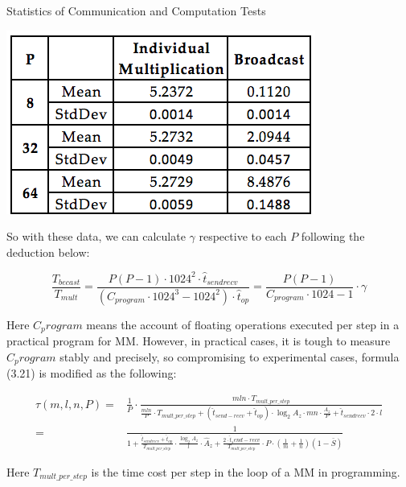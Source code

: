 \documentclass{amsart}
\theoremstyle{definition}
\theoremstyle{remark}
\numberwithin{equation}{section}
\begin{document}
\begin{table}[h]
\caption{Statistics of Communication and Computation Tests}
\includegraphics[scale=0.9]{figures/table_1.png}
\end{table}

So with these data, we can calculate $\gamma$ respective to each $P$ following the deduction below:

\begin{equation}
	\frac{T_{becast}}{T_{mult}} = \frac{P(P-1)\cdot 1024^{2} \cdot \hat{t}_{sendrecv}}{(C_{program} \cdot 1024^3 - 1024^2) \cdot \hat{t}_{op} } = \frac{P(P-1)}{C_{program} \cdot 1024 -1} \cdot \gamma
\end{equation}

Here $C_program$ means the account of floating operations executed per step in a practical program for MM. However, in practical cases, it is tough to measure $C_program$ stably and precisely, so compromising to experimental cases, formula (3.21) is modified as the following:

\begin{equation} 
	\renewcommand\arraystretch{1.75}
	\begin{array}{rl}
	\tau(m,l,n,P) =& \frac{1}{P} \cdot \frac{mln \cdot T_{mult \_ per \_ step}}{\frac{mln}{P} \cdot T_{mult \_ per \_ step} + (\hat{t}_{send-recv} + \hat{t}_{op}) \cdot \log_{2} A_{z} \cdot mn \cdot \frac{A_{z}}{P} + \hat{t}_{sendrecv} \cdot 2 \cdot l}\\ 
	=& \frac{1}{1 + \frac{\hat{t}_{sendrecv} + \hat{t}_{op}}{T_{mult \_ per \_ step} } \cdot \frac{\log_{2} \hat{A}_{z}}{l} \cdot \hat{A}_{z} + \frac{2 \cdot \hat{t}_send-recv}{T_{mult \_ per \_ step}} \cdot P \cdot (\frac{1}{m} + \frac{1}{n})(1- \bar{S}) }
	\end{array}
\end{equation}

Here $T_{mult \_ per \_ step}$ is the time cost per step in the loop of a MM in programming.
		
\end{document}
